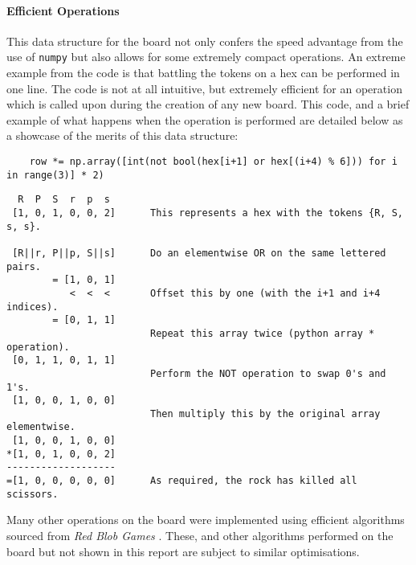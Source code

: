 \documentclass{article}
\begin{document}
\paragraph{Efficient Operations}
This data structure for the board not only confers the speed advantage from the use of \verb|numpy| but also allows for some extremely compact operations. An extreme example from the code is that battling the tokens on a hex can be performed in one line. The code is not at all intuitive, but extremely efficient for an operation which is called upon during the creation of any new board. This code, and a brief example of what happens when the operation is performed are detailed below as a showcase of the merits of this data structure:


\begin{listing}[h!]
\label{code: battle}
\begin{verbatim}
    row *= np.array([int(not bool(hex[i+1] or hex[(i+4) % 6])) for i in range(3)] * 2) 
\end{verbatim}
\end{listing}

\begin{center}
\begin{BVerbatim}
  R  P  S  r  p  s
 [1, 0, 1, 0, 0, 2]      This represents a hex with the tokens {R, S, s, s}.
 
 [R||r, P||p, S||s]      Do an elementwise OR on the same lettered pairs.
        = [1, 0, 1]
           <  <  <       Offset this by one (with the i+1 and i+4 indices).
        = [0, 1, 1]      
                         Repeat this array twice (python array * operation).
 [0, 1, 1, 0, 1, 1]
                         Perform the NOT operation to swap 0's and 1's.
 [1, 0, 0, 1, 0, 0]      
                         Then multiply this by the original array elementwise.
 [1, 0, 0, 1, 0, 0]
*[1, 0, 1, 0, 0, 2]
-------------------
=[1, 0, 0, 0, 0, 0]      As required, the rock has killed all scissors.
\end{BVerbatim}
\end{center}
Many other operations on the board were implemented using efficient algorithms sourced from \textit{Red Blob Games} \cite{patel_2020}. These, and other algorithms performed on the board but not shown in this report are subject to similar optimisations.
\end{document}
